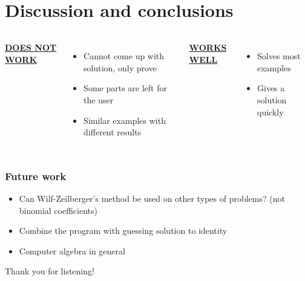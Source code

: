\documentclass{beamer}
\newcommand{\ubf}[1]{\underline{\textbf{#1}}}
\begin{document}
\section{Discussion and conclusions}
\begin{frame}
  \begin{columns}[t]

  \center
  \ubf{DOES NOT WORK}

  \justify
  \begin{itemize}
    \item<2-> Cannot come up with solution, only prove
    \item<3-> Some parts are left for the user
    \item<4-> Similar examples with different results
  \end{itemize}
  \center
  \ubf{WORKS WELL}

  \justify
  \begin{itemize}
    \item<5-> Solves most examples
    \item<6-> Gives a solution quickly
  \end{itemize}
  \end{columns}
\end{frame}
\begin{frame}
  \frametitle{Future work}
  \pause
  \begin{itemize}
    \item Can Wilf-Zeilberger's method be used on other types of problems? (not binomial coefficients)
    \pause
    \item Combine the program with guessing solution to identity
    \pause
    \item Computer algebra in general
  \end{itemize}
\end{frame}
\begin{frame}
  \Huge\center
  Thank you for listening!
\end{frame}

\appendix
\end{document}
